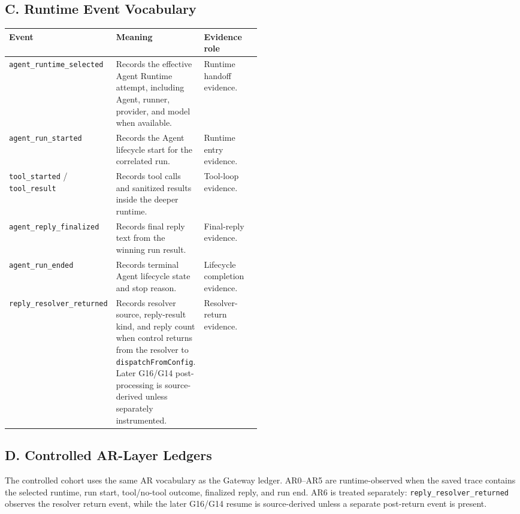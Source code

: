 \subsection*{C. Runtime Event Vocabulary}

\begin{tabularx}{\linewidth}{
    @{}
    >{\raggedright\arraybackslash}p{0.24\linewidth}
    >{\raggedright\arraybackslash}X
    >{\raggedright\arraybackslash}p{0.25\linewidth}
    @{}
}
\toprule
\textbf{Event} &
\textbf{Meaning} &
\textbf{Evidence role} \\
\midrule
\texttt{agent\_runtime\_selected} &
Records the effective Agent Runtime attempt, including Agent, runner,
provider, and model when available. &
Runtime handoff evidence. \\
\addlinespace
\texttt{agent\_run\_started} &
Records the Agent lifecycle start for the correlated run. &
Runtime entry evidence. \\
\addlinespace
\texttt{tool\_started} / \texttt{tool\_result} &
Records tool calls and sanitized results inside the deeper runtime. &
Tool-loop evidence. \\
\addlinespace
\texttt{agent\_reply\_finalized} &
Records final reply text from the winning run result. &
Final-reply evidence. \\
\addlinespace
\texttt{agent\_run\_ended} &
Records terminal Agent lifecycle state and stop reason. &
Lifecycle completion evidence. \\
\addlinespace
\texttt{reply\_resolver\_returned} &
Records resolver source, reply-result kind, and reply count when control
returns from the resolver to \texttt{dispatchFromConfig}. Later G16/G14
post-processing is source-derived unless separately instrumented. &
Resolver-return evidence. \\
\bottomrule
\end{tabularx}


\subsection*{D. Controlled AR-Layer Ledgers}

The controlled cohort uses the same AR vocabulary as the Gateway ledger.
AR0--AR5 are runtime-observed when the saved trace contains the selected
runtime, run start, tool/no-tool outcome, finalized reply, and run end.
AR6 is treated separately: \texttt{reply\_resolver\_returned} observes the
resolver return event, while the later G16/G14 resume is source-derived
unless a separate post-return event is present.

